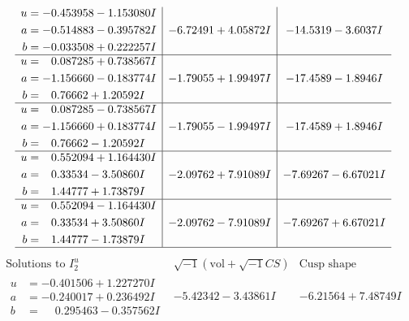 \documentclass[1p]{elsarticle_modified}
\theoremstyle{definition}
\newcommand{\I}{\sqrt{-1}}
\begin{document}
$$\begin{array}{c|c|c}
\begin{aligned}
u &= -0.453958 - 1.153080 I \\
a &= -0.514883 - 0.395782 I \\
b &= -0.033508 + 0.222257 I\end{aligned}
 & -6.72491 + 4.05872 I & -14.5319 - 3.6037 I \\ \hline\begin{aligned}
u &= \phantom{-}0.087285 + 0.738567 I \\
a &= -1.156660 - 0.183774 I \\
b &= \phantom{-}0.76662 + 1.20592 I\end{aligned}
 & -1.79055 + 1.99497 I & -17.4589 - 1.8946 I \\ \hline\begin{aligned}
u &= \phantom{-}0.087285 - 0.738567 I \\
a &= -1.156660 + 0.183774 I \\
b &= \phantom{-}0.76662 - 1.20592 I\end{aligned}
 & -1.79055 - 1.99497 I & -17.4589 + 1.8946 I \\ \hline\begin{aligned}
u &= \phantom{-}0.552094 + 1.164430 I \\
a &= \phantom{-}0.33534 - 3.50860 I \\
b &= \phantom{-}1.44777 + 1.73879 I\end{aligned}
 & -2.09762 + 7.91089 I & -7.69267 - 6.67021 I \\ \hline\begin{aligned}
u &= \phantom{-}0.552094 - 1.164430 I \\
a &= \phantom{-}0.33534 + 3.50860 I \\
b &= \phantom{-}1.44777 - 1.73879 I\end{aligned}
 & -2.09762 - 7.91089 I & -7.69267 + 6.67021 I\\
 \hline 
 \end{array}$$\newpage$$\begin{array}{c|c|c}  
\text{Solutions to }I^u_{2}& \I (\text{vol} + \sqrt{-1}CS) & \text{Cusp shape}\\
 \hline 
\begin{aligned}
u &= -0.401506 + 1.227270 I \\
a &= -0.240017 + 0.236492 I \\
b &= \phantom{-}0.295463 - 0.357562 I\end{aligned}
 & -5.42342 - 3.43861 I & -6.21564 + 7.48749 I \\ \hline\begin{aligned}

\end{aligned}
\end{array}$$
\end{document}
